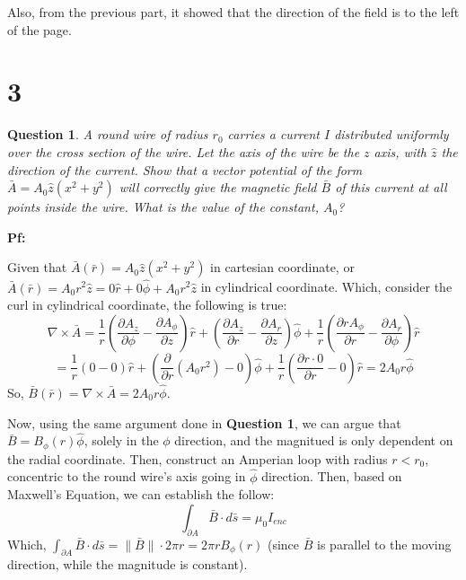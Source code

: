 \documentclass{article}
\newtheorem{question}{Question}
\begin{document}
Also, from the previous part, it showed that the direction of the field is to the left of the page.

\break

\section*{3}
\begin{myBox}[]{}
    \begin{question}
        A round wire of radius $r_0$ carries a current $I$ distributed uniformly
        over the cross section of the wire. Let the axis of the wire be the $z$
        axis, with $\hat{z}$ the direction of the current. Show that a vector potential 
        of the form $\bar{A}=A_0\hat{z}(x^2+y^2)$ will correctly give the magnetic
        field $\bar{B}$ of this current at all points inside the wire. What is the value
        of the constant, $A_0$?
    \end{question}
\end{myBox}

\textbf{Pf:}

Given that $\bar{A}(\bar{r})=A_0\hat{z}(x^2+y^2)$ in cartesian coordinate, or $\bar{A}(\bar{r})=A_0r^2\hat{z} = 0\hat{r}+0\hat{\phi}+A_0r^2\hat{z}$ in cylindrical coordinate.
Which, consider the curl in cylindrical coordinate, the following is true:
$$\nabla\times \bar{A}=\frac{1}{r}\left(\frac{\partial A_z}{\partial \phi}-\frac{\partial A_\phi}{\partial z}\right)\hat{r}+\left(\frac{\partial A_z}{\partial r}-\frac{\partial A_r}{\partial z}\right)\hat{\phi}+\frac{1}{r}\left(\frac{\partial rA_\phi}{\partial r}-\frac{\partial A_r}{\partial \phi}\right)\hat{r}$$
$$=\frac{1}{r}\left(0-0\right)\hat{r}+\left(\frac{\partial}{\partial r}(A_0r^2)-0\right)\hat{\phi}+\frac{1}{r}\left(\frac{\partial r\cdot 0}{\partial r}-0\right)\hat{r} =2A_0r\hat{\phi}$$
So, $\bar{B}(\bar{r})=\nabla\times \bar{A}=2A_0r\hat{\phi}$.

\hfill

Now, using the same argument done in \textbf{Question 1}, we can argue that $\bar{B}=B_\phi(r)\hat{\phi}$, solely in the $\phi$ direction, and the magnitued is only dependent on the radial coordinate.
Then, construct an Amperian loop with radius $r<r_0$, concentric to the round wire's axis going in $\hat{\phi}$ direction. Then, based on Maxwell's Equation, we can establish the follow:
$$\int_{\partial A}\bar{B}\cdot d\bar{s}=\mu_0 I_{enc}$$
Which, $\int_{\partial A}\bar{B}\cdot d\bar{s}=\|\bar{B}\|\cdot 2\pi r = 2\pi rB_\phi(r)$ (since $\bar{B}$ is parallel to the moving direction, while the magnitude is constant).
\end{document}
